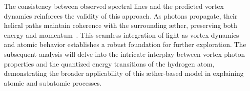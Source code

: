 The consistency between observed spectral lines and the predicted vortex dynamics reinforces the validity of this approach.
As photons propagate, their helical paths maintain coherence with the surrounding \ae ther, preserving both energy and momentum~\cite{verlinde2010, raymer2007}.
This seamless integration of light as vortex dynamics and atomic behavior establishes a robust foundation for further exploration.
The subsequent analysis will delve into the intricate interplay between vortex photon properties and the quantized energy transitions of the hydrogen atom, demonstrating the broader applicability of this \ae ther-based model in explaining atomic and subatomic processes.



